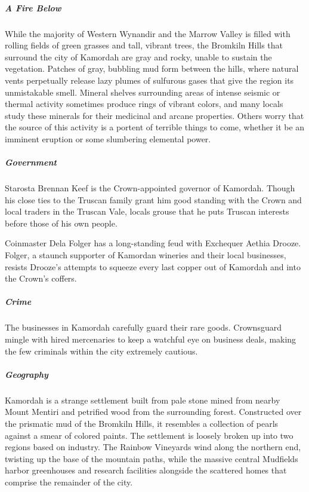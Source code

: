 \documentclass[10pt,a4paper,twoside,bg=print,twocolumn,openany,nodeprecatedcode]{dndbook}
\begin{document}
\subparagraph{A Fire Below}
While the majority of Western Wynandir and the Marrow Valley is filled with rolling fields of green grasses and tall, vibrant trees, the Bromkiln Hills that surround the city of Kamordah are gray and rocky, unable to sustain the vegetation. Patches of gray, bubbling mud form between the hills, where natural vents perpetually release lazy plumes of sulfurous gases that give the region its unmistakable smell. Mineral shelves surrounding areas of intense seismic or thermal activity sometimes produce rings of vibrant colors, and many locals study these minerals for their medicinal and arcane properties. Others worry that the source of this activity is a portent of terrible things to come, whether it be an imminent eruption or some slumbering elemental power.

\subparagraph{Government}
Starosta Brennan Keef is the Crown-appointed governor of Kamordah. Though his close ties to the Truscan family grant him good standing with the Crown and local traders in the Truscan Vale, locals grouse that he puts Truscan interests before those of his own people.

Coinmaster Dela Folger has a long-standing feud with Exchequer Aethia Drooze. Folger, a staunch supporter of Kamordan wineries and their local businesses, resists Drooze's attempts to squeeze every last copper out of Kamordah and into the Crown's coffers.

\subparagraph{Crime}
The businesses in Kamordah carefully guard their rare goods. Crownsguard mingle with hired mercenaries to keep a watchful eye on business deals, making the few criminals within the city extremely cautious.

\subparagraph{Geography}
Kamordah is a strange settlement built from pale stone mined from nearby Mount Mentiri and petrified wood from the surrounding forest. Constructed over the prismatic mud of the Bromkiln Hills, it resembles a collection of pearls against a smear of colored paints. The settlement is loosely broken up into two regions based on industry. The Rainbow Vineyards wind along the northern end, twisting up the base of the mountain paths, while the massive central Mudfields harbor greenhouses and research facilities alongside the scattered homes that comprise the remainder of the city.
\end{document}
